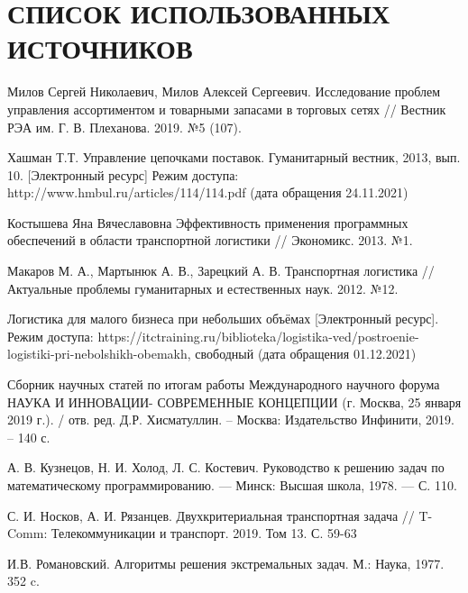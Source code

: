 \section*{СПИСОК ИСПОЛЬЗОВАННЫХ ИСТОЧНИКОВ}

\begingroup
\renewcommand{\section}[2]{}
\begin{thebibliography}{}
	 Милов Сергей Николаевич, Милов Алексей Сергеевич. Исследование проблем управления ассортиментом и товарными запасами в торговых сетях // Вестник РЭА им. Г. В. Плеханова. 2019. №5 (107).
	
	 Хашман Т.Т. Управление цепочками поставок. Гуманитарный вестник,
	2013, вып. 10. [Электронный ресурс] Режим доступа: http://www.hmbul.ru/articles/114/114.pdf (дата обращения 24.11.2021)
	
	 Костышева Яна Вячеславовна Эффективность применения программных обеспечений в области транспортной логистики // Экономикс. 2013. №1.
	
	 Макаров М. А., Мартынюк А. В., Зарецкий А. В. Транспортная логистика // Актуальные проблемы гуманитарных и естественных наук. 2012. №12.
	
	 Логистика для малого бизнеса при небольших объёмах [Электронный ресурс]. Режим доступа: https://itctraining.ru/biblioteka/logistika-ved/postroenie-logistiki-pri-nebolshikh-obemakh, свободный (дата обращения 01.12.2021)
	
	 Сборник научных статей по итогам работы Международного
	научного форума НАУКА И ИННОВАЦИИ- СОВРЕМЕННЫЕ
	КОНЦЕПЦИИ (г. Москва, 25 января 2019 г.). / отв. ред. Д.Р.
	Хисматуллин. – Москва: Издательство Инфинити, 2019. – 140 с.
	
	 А. В. Кузнецов, Н. И. Холод, Л. С. Костевич. Руководство к решению задач по математическому программированию. — Минск: Высшая школа, 1978. — С. 110.
	
	 С. И. Носков, А. И. Рязанцев. Двухкритериальная транспортная задача // T-Comm: Телекоммуникации и транспорт. 2019. Том 13. С. 59-63
	
	 И.В. Романовский. Алгоритмы решения экстремальных задач. М.: Наука, 1977. 352 c.
	

\end{thebibliography}
